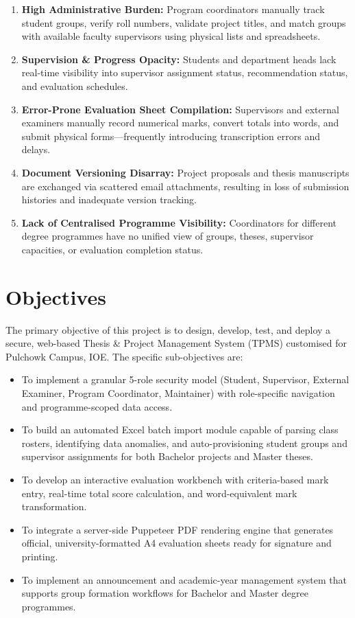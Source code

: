 \documentclass[12pt]{report}
\begin{document}
\begin{enumerate}[leftmargin=1.5cm]
    \item \textbf{High Administrative Burden:} Program coordinators manually track
          student groups, verify roll numbers, validate project titles, and match
          groups with available faculty supervisors using physical lists and spreadsheets.
    \item \textbf{Supervision \& Progress Opacity:} Students and department heads lack
          real-time visibility into supervisor assignment status, recommendation status,
          and evaluation schedules.
    \item \textbf{Error-Prone Evaluation Sheet Compilation:} Supervisors and external
          examiners manually record numerical marks, convert totals into words, and
          submit physical forms---frequently introducing transcription errors and delays.
    \item \textbf{Document Versioning Disarray:} Project proposals and thesis manuscripts
          are exchanged via scattered email attachments, resulting in loss of submission
          histories and inadequate version tracking.
    \item \textbf{Lack of Centralised Programme Visibility:} Coordinators for different
          degree programmes have no unified view of groups, theses, supervisor
          capacities, or evaluation completion status.
\end{enumerate}

\section{Objectives}
The primary objective of this project is to design, develop, test, and deploy a secure,
web-based Thesis \& Project Management System (TPMS) customised for Pulchowk Campus,
IOE. The specific sub-objectives are:

\begin{itemize}[leftmargin=1.5cm]
    \item To implement a granular 5-role security model (Student, Supervisor, External
          Examiner, Program Coordinator, Maintainer) with role-specific navigation and
          programme-scoped data access.
    \item To build an automated Excel batch import module capable of parsing class
          rosters, identifying data anomalies, and auto-provisioning student groups and
          supervisor assignments for both Bachelor projects and Master theses.
    \item To develop an interactive evaluation workbench with criteria-based mark entry,
          real-time total score calculation, and word-equivalent mark transformation.
    \item To integrate a server-side Puppeteer PDF rendering engine that generates
          official, university-formatted A4 evaluation sheets ready for signature and
          printing.
    \item To implement an announcement and academic-year management system that supports
          group formation workflows for Bachelor and Master degree programmes.
\end{itemize}
\end{document}
